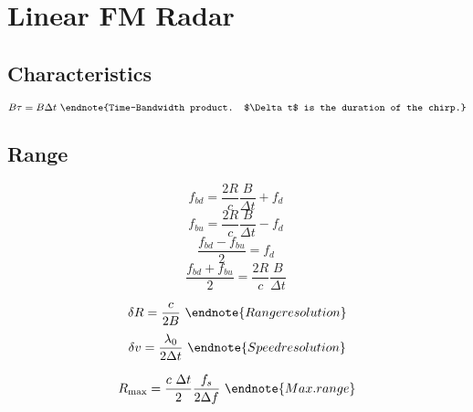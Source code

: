 \section{Linear FM Radar}

\subsection{Characteristics}
\begin{multicols}{3} \noindent
	$$ B \tau = B \Delta t \
		\endnote{Time-Bandwidth product. $\Delta t$ is the duration of the chirp.}
		$$
\end{multicols}

\subsection{Range}
\begin{multicols}{3} \noindent
	$$ f_{bd} = \frac{2R}{c} \frac{B}{\Delta t} + f_d \
		$$
	$$ f_{bu} = \frac{2R}{c} \frac{B}{\Delta t} - f_d \
		$$
	$$ \frac{f_{bd} - f_{bu}}{2} = f_d \
		$$
	$$ \frac{f_{bd} + f_{bu}}{2} = \frac{2R}{c} \frac{B}{\Delta t}\
		$$

	$$ \delta R = \frac{c}{2B} \
		\endnote{Range resolution}
		$$
	$$ \delta v = \frac{\lambda_0}{2\Delta t} \
		\endnote{Speed resolution}
		$$

	$$ R_\text{max} = \frac{c \ \Delta t}{2} \frac{f_s}{2 \Delta f} \
		\endnote{Max. range}
		$$

\end{multicols}


\printendnotes[itemize]
